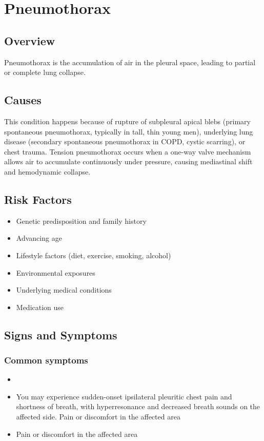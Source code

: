 \chapter{Pneumothorax}
\label{sec:Pneumothorax}

\section{Overview}
Pneumothorax is the accumulation of air in the pleural space, leading to partial or complete lung collapse.
\section{Causes}
This condition happens because of rupture of subpleural apical blebs (primary spontaneous pneumothorax, typically in tall, thin young men), underlying lung disease (secondary spontaneous pneumothorax in COPD, cystic scarring), or chest trauma. Tension pneumothorax occurs when a one-way valve mechanism allows air to accumulate continuously under pressure, causing mediastinal shift and hemodynamic collapse.     
\section{Risk Factors}

\begin{itemize}[noitemsep]
  \item Genetic predisposition and family history
  \item Advancing age
  \item Lifestyle factors (diet, exercise, smoking, alcohol)
  \item Environmental exposures
  \item Underlying medical conditions
  \item Medication use
\end{itemize}
\section{Signs and Symptoms}

\subsection{Common symptoms}
\begin{itemize}[noitemsep]
  \item \item You may experience sudden-onset ipsilateral pleuritic chest pain and shortness of breath, with hyperresonance and decreased breath sounds on the affected side. Pain or discomfort in the affected area    \item Pain or discomfort in the affected area
  \end{itemize}

